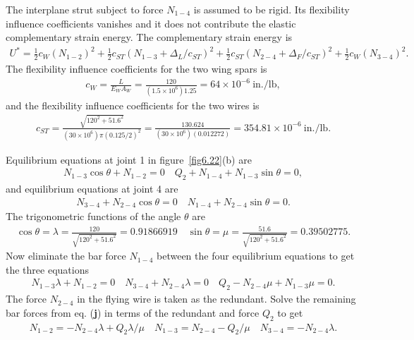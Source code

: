 \documentclass{AeroStructure-ERJohnson}
\begin{document}
\begin{example*}
The interplane strut subject to force $N_{1-4}$ is assumed to be rigid. Its flexibility influence coefficients vanishes and it does not contribute the elastic complementary strain energy. The complementary strain energy is
\begin{align}
U^{*}=\frac{1}{2} c_{W}(N_{1-2})^{2}+\frac{1}{2} c_{S T}(N_{1-3}+\Delta_{L} / c_{S T})^{2}+\frac{1}{2} c_{S T}(N_{2-4}+\Delta_{F} / c_{S T})^{2}+\frac{1}{2} c_{W}(N_{3-4})^{2}.
\end{align}
The flexibility influence coefficients for the two wing spars is
\begin{align}
c_{W}=\frac{L}{E_{W} A_{W}}=\frac{120}{\left(1.5 \times 10^{6}\right) 1.25}=64 \times 10^{-6}~\mathrm{in} . / \mathrm{lb},
\end{align}
and the flexibility influence coefficients for the two wires is
\begin{align}
c_{S T}=\frac{\sqrt{120^{2}+51.6^{2}}}{\left(30 \times 10^{6}\right) \pi(0.125 / 2)^{2}}=\frac{130.624}{\left(30 \times 10^{6}\right)(0.012272)}=354.81 \times 10^{-6}~\mathrm{in} . / \mathrm{lb}.
\end{align}

Equilibrium equations at joint 1 in figure~\ref{fig6.22}(b) are
\begin{align}
N_{1-3} \cos \theta+N_{1-2}=0 \quad Q_{2}+N_{1-4}+N_{1-3} \sin \theta=0,
\end{align}
and equilibrium equations at joint 4 are
\begin{align}
N_{3-4}+N_{2-4} \cos \theta=0 \quad N_{1-4}+N_{2-4} \sin \theta=0.
\end{align}
The trigonometric functions of the angle $\theta$ are
\begin{align}
\cos \theta=\lambda=\frac{120}{\sqrt{120^{2}+51.6^{2}}}=0.91866919 \quad \sin \theta=\mu=\frac{51.6}{\sqrt{120^{2}+51.6^{2}}}=0.39502775.
\end{align}
Now eliminate the bar force $N_{1-4}$ between the four equilibrium equations to get the three equations
\begin{align}
N_{1-3} \lambda+N_{1-2}=0 \quad N_{3-4}+N_{2-4} \lambda=0 \quad Q_{2}-N_{2-4} \mu+N_{1-3} \mu=0.
\end{align}
The force $N_{2-4}$ in the flying wire is taken as the redundant. Solve the remaining bar forces from eq. (\textbf{j}) in terms of the redundant and force $Q_2$ to get
\begin{align}
N_{1-2}=-N_{2-4} \lambda+Q_{2} \lambda / \mu \quad N_{1-3}=N_{2-4}-Q_{2} / \mu \quad N_{3-4}=-N_{2-4} \lambda.
\end{align}


\end{example*}
\end{document}
